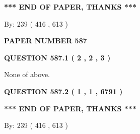 \documentclass[12pt]{article}
\begin{document}
   
   
   
   
\vspace{1.0in} 
{\textbf{\large{ *** END OF PAPER, THANKS *** }}} 
   
   
\hspace{1.0in} By: 
 239 ( 416 ,  613 )
   
   
   
   
\newpage 
\setcounter{page}{ 
   587001 } 
   
   
   
   
 {\textbf{ \Large{ PAPER NUMBER  587  }}}
   
   
\vspace{0.2in}
   
   
   
   
   
   
 \vspace{0.2in}
 
 
 
 
   
   
  
\vspace{0.2in}
  
{\textbf{\Large{QUESTION
587.1 
 ( 2 , 2 , 3 )
}}}
  
  
 
 
\noindent{}
 
 
 None of above.
 
 
 
 
  
\vspace{0.2in}
  
{\textbf{\Large{QUESTION
587.2 
 ( 1 , 1 , 6791 )
}}}
  
  
   
   
 \vspace{0.2in}
 
   
   
   
   
\vspace{1.0in} 
{\textbf{\large{ *** END OF PAPER, THANKS *** }}} 
   
   
\hspace{1.0in} By: 
 239 ( 416 ,  613 )
   
   
   
   
\newpage 
\setcounter{page}{ 
   588001 } 
   
\end{document}
